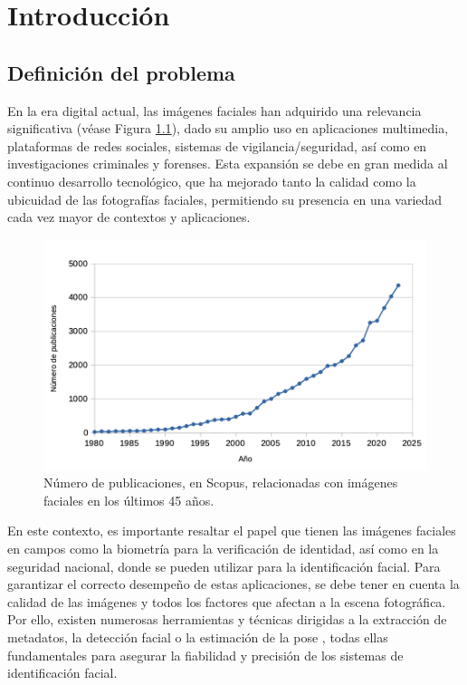 \chapter{Introducción}
\thispagestyle{empty}

\section{Definición del problema}

En la era digital actual, las imágenes faciales han adquirido una relevancia significativa (véase Figura \ref{fig1.1}), dado su amplio uso en aplicaciones multimedia, plataformas de redes sociales, sistemas de vigilancia/seguridad, así como en investigaciones criminales y forenses. %
Esta expansión se debe en gran medida al continuo desarrollo tecnológico, que ha mejorado tanto la calidad como la ubicuidad de las fotografías faciales, permitiendo su presencia en una variedad cada vez mayor de contextos y aplicaciones.


\begin{figure}[h]
	\centering
	\includegraphics[scale=0.7]{imagenes/cap1/tabla1_facial_images_grande2.png}
	\caption{Número de publicaciones, en Scopus, relacionadas con imágenes faciales en los últimos 45 años.}
	\label{fig1.1}
\end{figure}

En este contexto, es importante resaltar el papel que tienen las imágenes faciales en campos como la biometría para la verificación de identidad, así como en la seguridad nacional, donde se pueden utilizar para la identificación facial. 
Para garantizar el correcto desempeño de estas aplicaciones, se debe tener en cuenta la calidad de las imágenes y todos los factores que afectan a la escena fotográfica.
Por ello, existen numerosas herramientas y técnicas dirigidas a la extracción de metadatos, la detección facial o la estimación de la pose \cite{56}, todas ellas fundamentales para asegurar la fiabilidad y precisión de los sistemas de identificación facial. %

